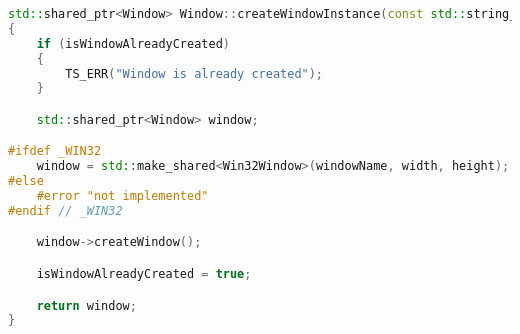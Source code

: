 \begin{lstlisting}[language=c++, caption=\texttt{createWindowInstance} (./engine/src/core/window.cpp)]
std::shared_ptr<Window> Window::createWindowInstance(const std::string_view windowName, const size_t width, const size_t height)
{
    if (isWindowAlreadyCreated)
    {
        TS_ERR("Window is already created");
    }

    std::shared_ptr<Window> window;

#ifdef _WIN32
    window = std::make_shared<Win32Window>(windowName, width, height);
#else
    #error "not implemented"
#endif // _WIN32

    window->createWindow();

    isWindowAlreadyCreated = true;

    return window;
}
\end{lstlisting}